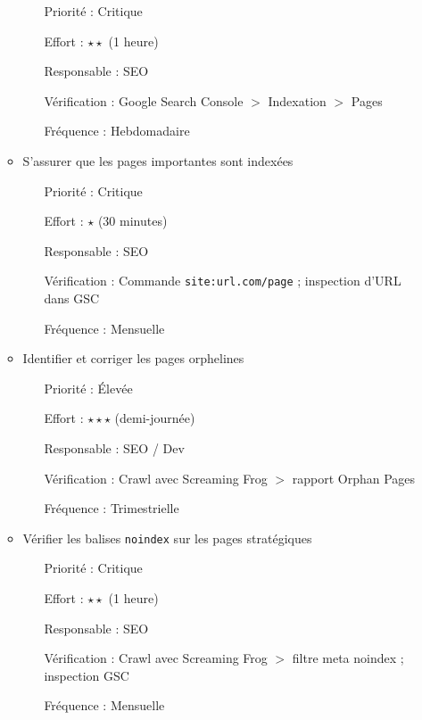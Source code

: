 \documentclass[12pt,a4paper,twoside]{report}
\begin{document}
\begin{enumerate}
\begin{itemize}
\begin{itemize}
            \item[Priorité :] Critique
            \item[Effort :] $\star\star$ (1 heure)
            \item[Responsable :] SEO
            \item[Vérification :] Google Search Console $>$ Indexation $>$ Pages
            \item[Fréquence :] Hebdomadaire
        \end{itemize}
        \item S'assurer que les pages importantes sont indexées
        \begin{itemize}
            \item[Priorité :] Critique
            \item[Effort :] $\star$ (30 minutes)
            \item[Responsable :] SEO
            \item[Vérification :] Commande \texttt{site:url.com/page} ; inspection d'URL dans GSC
            \item[Fréquence :] Mensuelle
        \end{itemize}
        \item Identifier et corriger les pages orphelines
        \begin{itemize}
            \item[Priorité :] Élevée
            \item[Effort :] $\star\star\star$ (demi-journée)
            \item[Responsable :] SEO / Dev
            \item[Vérification :] Crawl avec Screaming Frog $>$ rapport Orphan Pages
            \item[Fréquence :] Trimestrielle
        \end{itemize}
        \item Vérifier les balises \texttt{noindex} sur les pages stratégiques
        \begin{itemize}
            \item[Priorité :] Critique
            \item[Effort :] $\star\star$ (1 heure)
            \item[Responsable :] SEO
            \item[Vérification :] Crawl avec Screaming Frog $>$ filtre meta noindex ; inspection GSC
            \item[Fréquence :] Mensuelle
        \end{itemize}
    \end{itemize}


\end{enumerate}
\end{document}
